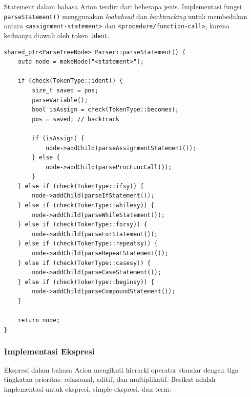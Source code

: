 \documentclass[12pt,a4paper]{article}
\begin{document}
Statement dalam bahasa Arion terdiri dari beberapa jenis. Implementasi fungsi \texttt{parseStatement()} menggunakan \textit{lookahead} dan \textit{backtracking} untuk membedakan antara \texttt{<assignment-statement>} dan \texttt{<procedure/function-call>}, karena keduanya diawali oleh token \texttt{ident}.

\begin{lstlisting}[style=cpp, caption={Implementasi parsing statement}]
shared_ptr<ParseTreeNode> Parser::parseStatement() {
    auto node = makeNode("<statement>");

    if (check(TokenType::ident)) {
        size_t saved = pos;
        parseVariable();
        bool isAssign = check(TokenType::becomes);
        pos = saved; // backtrack

        if (isAssign) {
            node->addChild(parseAssignmentStatement());
        } else {
            node->addChild(parseProcFuncCall());
        }
    } else if (check(TokenType::ifsy)) {
        node->addChild(parseIfStatement());
    } else if (check(TokenType::whilesy)) {
        node->addChild(parseWhileStatement());
    } else if (check(TokenType::forsy)) {
        node->addChild(parseForStatement());
    } else if (check(TokenType::repeatsy)) {
        node->addChild(parseRepeatStatement());
    } else if (check(TokenType::casesy)) {
        node->addChild(parseCaseStatement());
    } else if (check(TokenType::beginsy)) {
        node->addChild(parseCompoundStatement());
    }

    return node;
}
\end{lstlisting}

\subsubsection{Implementasi Ekspresi}

Ekspresi dalam bahasa Arion mengikuti hierarki operator standar dengan tiga tingkatan prioritas: relasional, aditif, dan multiplikatif. Berikut adalah implementasi untuk ekspresi, simple-ekspresi, dan term:
\end{document}
